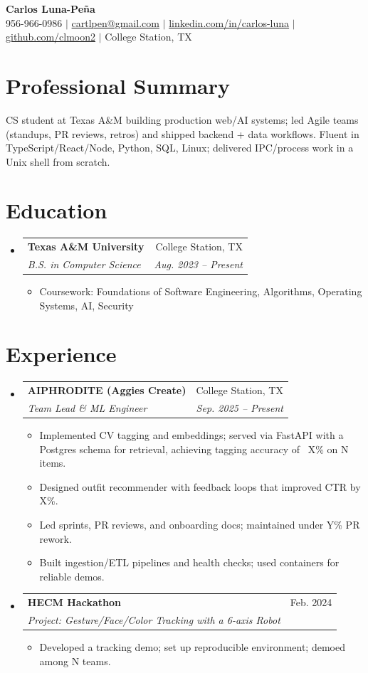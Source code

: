 \documentclass[letterpaper,11pt]{article}
\makeatletter
\newcommand{\resumeItem}[1]{
  \item\small{{#1 \vspace{-2pt}}}
}
\newcommand{\resumeSubheading}[4]{
  \vspace{-2pt}\item
  \begin{tabular*}{0.97\textwidth}[t]{l@{\extracolsep{\fill}}r}
    \textbf{#1} & #2 \\
    \textit{\small#3} & \textit{\small #4} \\
  \end{tabular*}\vspace{-7pt}
}
\newcommand{\resumeSubHeadingListStart}{\begin{itemize}[leftmargin=0.15in, label={}]}
\newcommand{\resumeSubHeadingListEnd}{\end{itemize}}
\newcommand{\resumeItemListStart}{\begin{itemize}}
\newcommand{\resumeItemListEnd}{\end{itemize}\vspace{-5pt}}
\makeatother
\begin{document}
\begin{center}
    \textbf{\Huge Carlos Luna-Pe\~na} \\ \vspace{1pt}
    956-966-0986 $|$ \href{mailto:cartlpen@gmail.com}{cartlpen@gmail.com} $|$ 
    \href{https://linkedin.com/in/carlos-luna}{linkedin.com/in/carlos-luna} $|$ 
    \href{https://github.com/clmoon2}{github.com/clmoon2} $|$ 
    College Station, TX
\end{center}

\section{Professional Summary}
CS student at Texas A\&M building production web/AI systems; led Agile teams (standups, PR reviews, retros) and shipped backend + data workflows. Fluent in TypeScript/React/Node, Python, SQL, Linux; delivered IPC/process work in a Unix shell from scratch.

\section{Education}
\resumeSubHeadingListStart
  \resumeSubheading
    {Texas A\&M University}{College Station, TX}
    {B.S. in Computer Science}{Aug. 2023 -- Present}
\resumeItemListStart
    \resumeItem{Coursework: Foundations of Software Engineering, Algorithms, Operating Systems, AI, Security}
\resumeItemListEnd
\resumeSubHeadingListEnd

\section{Experience}
\resumeSubHeadingListStart
  \resumeSubheading
    {AIPHRODITE (Aggies Create)}{College Station, TX}
    {Team Lead \& ML Engineer}{Sep. 2025 -- Present}
    \resumeItemListStart
      \resumeItem{Implemented CV tagging and embeddings; served via FastAPI with a Postgres schema for retrieval, achieving tagging accuracy of ~{X}\% on {N} items.}
      \resumeItem{Designed outfit recommender with feedback loops that improved CTR by {X}\%.}
      \resumeItem{Led sprints, PR reviews, and onboarding docs; maintained under {Y}\% PR rework.}
      \resumeItem{Built ingestion/ETL pipelines and health checks; used containers for reliable demos.}
    \resumeItemListEnd
  \resumeSubheading
    {HECM Hackathon}{Feb. 2024}
    {Project: Gesture/Face/Color Tracking with a 6-axis Robot}{}
    \resumeItemListStart
      \resumeItem{Developed a tracking demo; set up reproducible environment; demoed among {N} teams.}
    \resumeItemListEnd
\resumeSubHeadingListEnd
\end{document}
